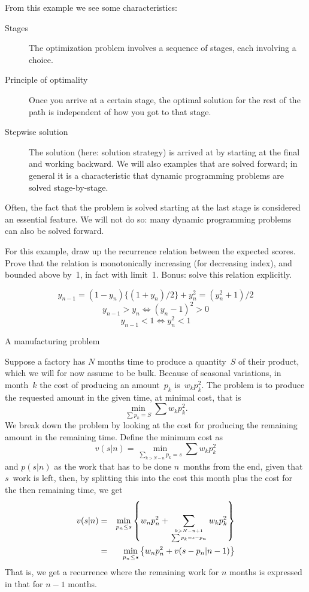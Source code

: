 From this example we see some characteristics:
\begin{description}
\item[Stages] The optimization problem involves a sequence of stages, each
  involving a choice.
\item[Principle of optimality] Once you arrive at a certain stage, the
  optimal solution for the rest of the path is independent of how you
  got to that stage.
\item[Stepwise solution] The solution (here: solution strategy) is
  arrived at by starting at the final and working backward. We will
  also examples that are solved forward; in general it is a
  characteristic that dynamic programming problems are solved stage-by-stage.
\end{description}
Often, the fact that the problem is solved starting at the last stage
is considered an essential feature. We will not do so: many dynamic
programming problems can also be solved forward.

\begin{594exercise}
For this example, draw up the recurrence relation
between the expected scores. Prove that the relation is
monotonically increasing (for decreasing index), and bounded above
by~1, in fact with limit~1. Bonus: solve this relation explicitly.
\end{594exercise}
\begin{answer}
\[ y_{n-1}=(1-y_n)\{(1+y_n)/2\}+y_n^2=(y_n^2+1)/2\]
\[ y_{n-1}>y_n\Leftrightarrow(y_n-1)^2>0\]
\[ y_{n-1}<1\Leftrightarrow y_n^2<1\]
\end{answer}

 {A manufacturing problem}

Suppose a factory has $N$ months time to produce a quantity~$S$ of
their product, which we will for now assume to be bulk. Because of
seasonal variations, in month~$k$ the cost of producing an
amount~$p_k$ is~$w_kp_k^2$. The problem is to produce the requested
amount in the given time, at minimal cost, that is
\[ \min_{\sum p_k=S}\sum w_kp_k^2.\]
We break down the problem by looking at the cost for producing the
remaining amount in the remaining time. Define the minimum cost as
\[ v(s|n)=\min_{\sum_{k>N-n} p_k=s}\sum w_kp_k^2 \]
and $p(s|n)$ as the work that has to be done $n$~months from the end,
given that $s$~work is left,
then, by splitting this into the cost this month plus the cost for the
then remaining time, we get
\begin{eqnarray*}
    v(s|n)&=&\min_{p_n\leq s}\left\{w_np_n^2
        +\sum_{{k>N-n+1\atop\sum p_k=s-p_n}}w_kp_k^2\right\} \\
        &=&\min_{p_n\leq s}\left\{ w_np_n^2+v(s-p_n|n-1)\right\}
\end{eqnarray*}
That is, we get a recurrence where the remaining work for $n$ months
is expressed in that for $n-1$ months.

